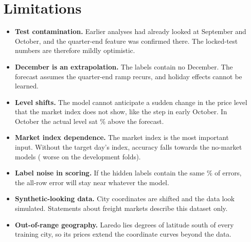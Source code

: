 \section{Limitations}

\begin{itemize}
  \item \textbf{Test contamination.} Earlier analyses had already looked at September and October, and the
        quarter-end feature was confirmed there. The locked-test numbers are therefore mildly optimistic.
  \item \textbf{December is an extrapolation.} The labels contain no December. The forecast assumes the
        quarter-end ramp recurs, and holiday effects cannot be learned.
  \item \textbf{Level shifts.} The model cannot anticipate a sudden change in the price level that the market index
        does not show, like the step in early October. In October the actual level sat
        \OctoberUnderForecast\% above the forecast.
  \item \textbf{Market index dependence.} The market index is the most important input. Without the target day's
        index, accuracy falls towards the no-market models (\usd{\AblNoMarket} worse on the development folds).
  \item \textbf{Label noise in scoring.} If the hidden labels contain the same \CorruptPct\% of errors, the all-row
        error will stay near \usd{\TestFinalAllMAE} whatever the model.
  \item \textbf{Synthetic-looking data.} City coordinates are shifted and the data look simulated. Statements about
        freight markets describe this dataset only.
  \item \textbf{Out-of-range geography.} Laredo lies \LaredoDegreesSouth{} degrees of latitude south of every training city, so its
        prices extend the coordinate curves beyond the data.
\end{itemize}
